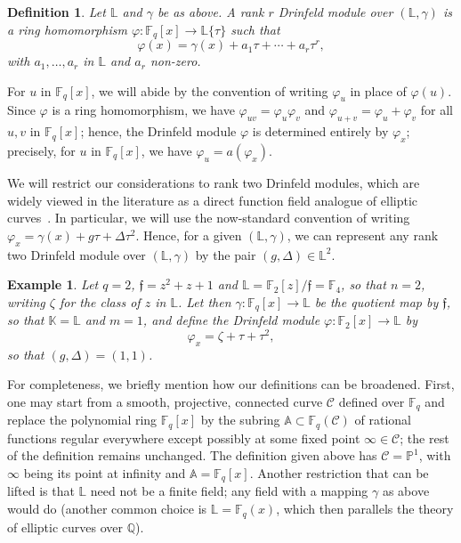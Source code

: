 \documentclass[sigconf]{acmart}
\newtheorem{definition}{Definition}
\newtheorem{example}{Example}
\newcommand{\A}{\mathbb{A}}
\newcommand{\Q}{\mathbb{Q}}
\renewcommand{\P}{\mathbb{P}}
\newcommand{\K}{\mathbb{K}}
\newcommand{\F}{\mathbb{F}}
\renewcommand{\L}{\mathbb{L}}
\newcommand{\ang}[1]{\{#1\}}
\newcommand{\frakf}{\mathfrak{f}}
\begin{document}
\begin{definition}\label{def:Drinfeld}
  Let $\L$ and $\gamma$ be as above.  A rank $r$ {\em Drinfeld module}
  over $(\L,\gamma)$ is a ring homomorphism $\varphi: \F_q[x] \to
  \L\ang{\tau}$ such that
  \[\varphi(x) = \gamma(x) + a_1 \tau + \cdots + a_r\tau^r,\]
  with $a_1,\dots,a_r$ in $\L$ and $a_r$ non-zero.
\end{definition}
For $u$ in $\F_q[x]$, we will abide by the convention of writing
$\varphi_u$ in place of $\varphi(u)$. Since $\varphi$ is a ring
homomorphism, we have $\varphi_{uv} = \varphi_u \varphi_v$ and
$\varphi_{u+v} = \varphi_u+ \varphi_v$ for all $u,v$ in $\F_q[x]$;
hence, the Drinfeld module $\varphi$ is determined entirely by
$\varphi_x$; precisely, for $u$ in $\F_q[x]$, we have $\varphi_u =
a(\varphi_x)$.

We will restrict our considerations to rank two Drinfeld modules,
which are widely viewed in the literature as a direct function field
analogue of elliptic curves~\cite{GEKELE1991187}. In particular, we
will use the now-standard convention of writing $\varphi_x = \gamma(x)
+ g \tau + \Delta \tau^2$. Hence, for a given $(\L,\gamma)$, we can
represent any rank two Drinfeld module over $(\L,\gamma)$ by the pair
$(g,\Delta) \in\L^2$.

\begin{example}
  Let $q = 2$, $\frakf = z^2 + z + 1$ and $\L = \F_2[z]/\frakf =
  \mathbb{F}_4$, so that $n=2$, writing $\zeta$ for the class of $z$
  in $\L$.  Let then $\gamma: \F_q[x] \to \L$ be the quotient map by
  $\frakf$, so that $\K=\L$ and $m=1$, and define the Drinfeld module
  $\varphi: \F_2[x] \to \L$ by
\[ \varphi_x = \zeta + \tau + \tau^2,\]
so that $(g,\Delta)=(1,1)$.
\end{example}


For completeness, we briefly mention how our definitions can be
broadened. First, one may start from a smooth, projective, connected curve
$\mathcal{C}$ defined over $\F_q$ and replace the polynomial ring
$\F_q[x]$ by the subring $\A\subset \F_q(\mathcal{C})$ of rational
functions regular everywhere except possibly at some fixed point
$\infty \in \mathcal{C}$; the rest of the definition remains
unchanged. The definition given above has $\mathcal{C} = \P^1$, with
$\infty$ being its point at infinity and $\A=\F_q[x]$. Another
restriction that can be lifted is that $\L$ need not be a finite
field; any field with a mapping $\gamma$ as above would do (another
common choice is $\L=\F_q(x)$, which then parallels the theory of
elliptic curves over $\Q$).
\end{document}
